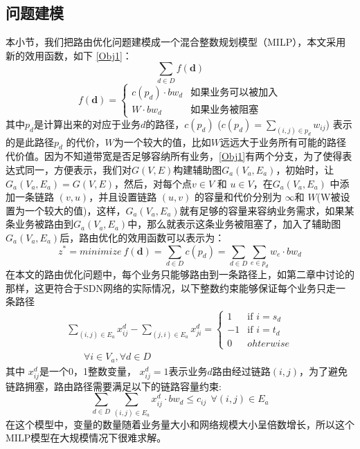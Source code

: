 \subsection{问题建模}
本小节，我们把路由优化问题建模成一个混合整数规划模型（MILP），本文采用新的效用函数，如下 \ref{Obj1}：
\begin{equation}\label{Obj1}
\sum\limits_{d \in D} f(\mathbf{d})
\end{equation}
\begin{equation}\label{obin}
f(\mathbf{d})=\begin{cases}
c(p_d) \cdot bw_{d} & \text{如果业务可以被加入}\\
W \cdot bw_{d}& \text{如果业务被阻塞}
\end{cases}
\end{equation}
其中$p_d$是计算出来的对应于业务$d$的路径，$c(p_d)$ ($c(p_d) = \sum_{(i,j)\in p_d} w_{ij}$) 表示的是此路径$p_d$ 的代价，$W$为一个较大的值，比如$W$远远大于业务所有可能的路径代价值。因为不知道带宽是否足够容纳所有业务，\ref{Obj1}有两个分支，为了使得表达式同一，方便表示，我们对$G(V, E)$构建辅助图$G_a(V_a, E_a)$，初始时，让$G_a(V_a, E_a) = G(V, E)$，然后，对每个点$v \in V$ 和 $u \in V$，在$G_a(V_a, E_a)$ 中添加一条链路 $(v, u)$，并且设置链路 $(u,v)$ 的容量和代价分别为 $\infty$和 $W$(W被设置为一个较大的值)，这样，$G_a(V_a, E_a)$就有足够的容量来容纳业务需求，如果某条业务被路由到$G_a(V_a, E_a)$中，那么就表示这条业务被阻塞了，加入了辅助图$G_a(V_a, E_a)$后，路由优化的效用函数可以表示为：
\begin{equation}\label{Obj2}
z^* = minimize~f(\mathbf{d})=
\sum\limits_{d \in D} c(p_d)= \sum\limits_{d \in D}\sum\limits_{e \in p_d} w_e \cdot bw_d
\end{equation}
在本文的路由优化问题中，每个业务只能够路由到一条路径上，如第二章中讨论的那样，这更符合于SDN网络的实际情况，以下整数约束能够保证每个业务只走一条路径
\begin{equation}\label{FlowConv}
\begin{split}
\sum\limits_{(i,j) \in E_a} x_{ij}^d - \sum\limits_{(j,i) \in E_a} x_{ji}^d
=\begin{cases}
1 & \text{if $i = s_d$}\\
-1 & \text{if $i = t_d$} \\
0 &{ohterwise}
\end{cases}
\\~~~~~~~~\forall i\in V_a, \forall d\in D
\end{split}
\end{equation}
其中 $x_{ij}^d$是一个0，1整数变量， $x_{ij}^d=1$表示业务$d$路由经过链路$(i,j)$，为了避免链路拥塞，路由路径需要满足以下的链路容量约束:
\begin{equation}\label{Capcon}
\sum\limits_{d \in D}\sum\limits_{(i,j) \in E_a} x_{ij}^d \cdot bw_d \le c_{ij} ~~\forall (i,j)\in E_a
\end{equation}
在这个模型中，变量的数量随着业务量大小和网络规模大小呈倍数增长，所以这个MILP模型在大规模情况下很难求解。
